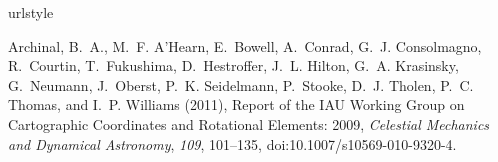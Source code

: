 %
%
%
%
%
%
%
%
%
%


\begin{thebibliography}{22}
\providecommand{\natexlab}[1]{#1}
\expandafter\ifx\csname urlstyle\endcsname\relax
  \providecommand{\doi}[1]{doi:\discretionary{}{}{}#1}\else
  \providecommand{\doi}{doi:\discretionary{}{}{}\begingroup
  \urlstyle{rm}\Url}\fi

{Archinal}, B.~A., M.~F. {A'Hearn}, E.~{Bowell}, A.~{Conrad}, G.~J.
  {Consolmagno}, R.~{Courtin}, T.~{Fukushima}, D.~{Hestroffer}, J.~L. {Hilton},
  G.~A. {Krasinsky}, G.~{Neumann}, J.~{Oberst}, P.~K. {Seidelmann},
  P.~{Stooke}, D.~J. {Tholen}, P.~C. {Thomas}, and I.~P. {Williams} (2011),
  {Report of the IAU Working Group on Cartographic Coordinates and Rotational
  Elements: 2009}, \textit{Celestial Mechanics and Dynamical Astronomy},
  \textit{109}, 101--135, \doi{10.1007/s10569-010-9320-4}.


\end{thebibliography}

